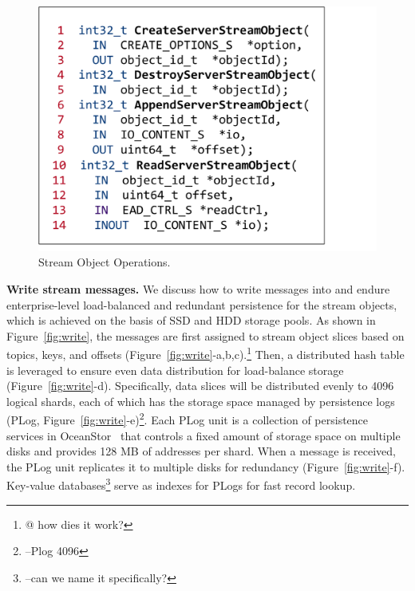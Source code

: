 \begin{figure}[!t]
	\centering
	\hspace{2.5em}
	\includegraphics[scale=0.35]{figures/streamobject}
	\vspace{-1em}
	\caption{Stream Object Operations.}
	\label{fig:streamobject}
	\vspace{-1em}
\end{figure}



\noindent \textbf{Write stream messages.} We discuss how to write messages into \sys and endure enterprise-level load-balanced and redundant persistence for the stream objects, which is achieved on the basis of SSD and HDD storage pools.  As shown in Figure~\ref{fig:write}, the messages are first   assigned to stream object slices based on topics, keys, and offsets (Figure~\ref{fig:write}-a,b,c).\footnote{@ how dies it work?} Then, a distributed hash table is leveraged to ensure even data distribution for load-balance storage (Figure~\ref{fig:write}-d). Specifically, data slices will be distributed evenly to 4096 logical shards, each of which has the storage space managed by persistence logs (PLog, Figure~\ref{fig:write}-e)\footnote{--Plog 4096}. Each PLog unit is a collection of persistence services in OceanStor~\cite{} that controls a fixed amount of storage space on multiple disks and provides 128 MB of addresses per shard. When a message is received, the PLog unit replicates it to multiple disks for redundancy (Figure~\ref{fig:write}-f). Key-value databases\footnote{--can we name it specifically?} serve as indexes for PLogs for fast record lookup.



